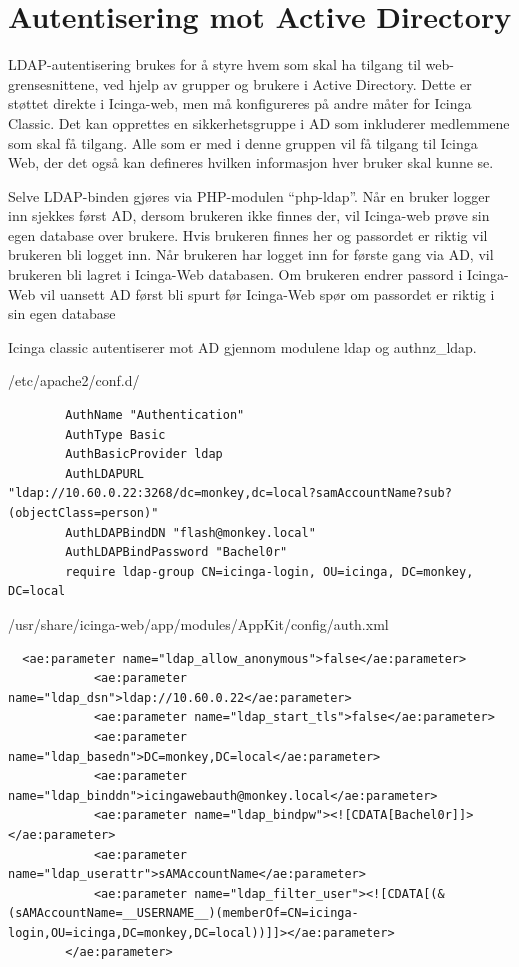 \section{Autentisering mot Active Directory} 
LDAP-autentisering brukes for å styre hvem som skal ha tilgang til web-grensesnittene, ved hjelp av grupper og brukere i Active Directory. Dette er støttet direkte i Icinga-web, men må konfigureres på andre måter for Icinga Classic. Det kan opprettes en sikkerhetsgruppe i AD som inkluderer medlemmene som skal få tilgang. Alle som er med i denne gruppen vil få tilgang til Icinga Web, der det også kan defineres hvilken informasjon hver bruker skal kunne se. 

Selve LDAP-binden gjøres via PHP-modulen “php-ldap”. Når en bruker logger inn sjekkes først AD, dersom brukeren ikke finnes der, vil Icinga-web prøve sin egen database over brukere. Hvis brukeren finnes her og passordet er riktig vil brukeren bli logget inn. Når brukeren har logget inn for første gang via AD, vil brukeren bli lagret i Icinga-Web databasen. Om brukeren endrer passord i Icinga-Web vil uansett AD først bli spurt før Icinga-Web spør om passordet er riktig i sin egen database

Icinga classic autentiserer mot AD gjennom modulene ldap og authnz\_ldap.

/etc/apache2/conf.d/

\begin{lstlisting}
        AuthName "Authentication"
        AuthType Basic
        AuthBasicProvider ldap
        AuthLDAPURL
"ldap://10.60.0.22:3268/dc=monkey,dc=local?samAccountName?sub?(objectClass=person)"
        AuthLDAPBindDN "flash@monkey.local"
        AuthLDAPBindPassword "Bachel0r"
        require ldap-group CN=icinga-login, OU=icinga, DC=monkey, DC=local
\end{lstlisting}

/usr/share/icinga-web/app/modules/AppKit/config/auth.xml

\begin{lstlisting}
  <ae:parameter name="ldap_allow_anonymous">false</ae:parameter>
            <ae:parameter name="ldap_dsn">ldap://10.60.0.22</ae:parameter>
            <ae:parameter name="ldap_start_tls">false</ae:parameter>
            <ae:parameter name="ldap_basedn">DC=monkey,DC=local</ae:parameter>
            <ae:parameter name="ldap_binddn">icingawebauth@monkey.local</ae:parameter>
            <ae:parameter name="ldap_bindpw"><![CDATA[Bachel0r]]></ae:parameter>
            <ae:parameter name="ldap_userattr">sAMAccountName</ae:parameter>
            <ae:parameter name="ldap_filter_user"><![CDATA[(&(sAMAccountName=__USERNAME__)(memberOf=CN=icinga-login,OU=icinga,DC=monkey,DC=local))]]></ae:parameter>
        </ae:parameter>
\end{lstlisting}


